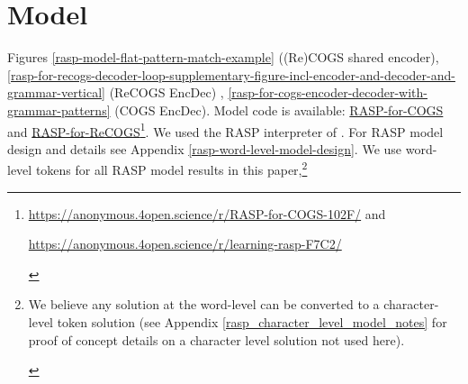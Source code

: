 \documentclass[11pt]{article}
\begin{document}
\section{Model}
\label{model}
Figures \ref{rasp-model-flat-pattern-match-example} ((Re)COGS shared encoder), \ref{rasp-for-recogs-decoder-loop-supplementary-figure-incl-encoder-and-decoder-and-grammar-vertical} (ReCOGS EncDec) , \ref{rasp-for-cogs-encoder-decoder-with-grammar-patterns} (COGS EncDec).
Model code is available: \href{https://anonymous.4open.science/r/RASP-for-COGS-102F/}{RASP-for-COGS} and \href{https://anonymous.4open.science/r/learning-rasp-F7C2/}{RASP-for-ReCOGS}\footnote{\href{https://anonymous.4open.science/r/RASP-for-COGS-102F/}{https://anonymous.4open.science/r/RASP-for-COGS-102F/} and \begin{footnotesize}\href{https://anonymous.4open.science/r/learning-rasp-F7C2/}{https://anonymous.4open.science/r/learning-rasp-F7C2/}
\end{footnotesize}
}. We used the RASP interpreter of \cite{Weiss2021}. For RASP model design and details see Appendix \ref{rasp-word-level-model-design}. We use word-level tokens for all RASP model results in this paper,\footnote{\begin{footnotesize}We believe any solution at the word-level can be converted to a character-level token solution (see Appendix \ref{rasp_character_level_model_notes} for proof of concept details on a character level solution not used here).
\end{footnotesize}
}
\end{document}
